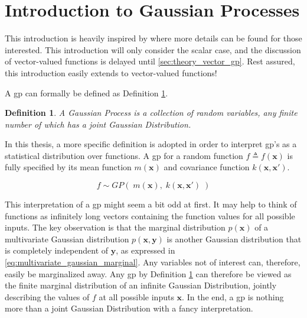 \section{Introduction to Gaussian Processes}\label{sec:gp}

This introduction is heavily inspired by \cite{rasmussen} where more details can be found for those interested. This introduction will only consider the scalar case, and the discussion of vector-valued functions is delayed until \cref{sec:theory_vector_gp}. Rest assured, this introduction easily extends to vector-valued functions!

A \acrfull{gp} can formally be defined as Definition \ref{def:gp}.

\newtheorem{gp_def}{Definition}
\begin{gp_def}\label{def:gp}
A Gaussian Process is a collection of random variables, any finite number of which has a joint Gaussian Distribution.
\end{gp_def}

In this thesis, a more specific definition is adopted in order to interpret \acrshort{gp}'s as a statistical distribution over functions. A \acrshort{gp} for a random function $f \triangleq f(\boldsymbol{x})$ is fully specified by its mean function $m(\boldsymbol{x})$ and covariance function $k(\boldsymbol{x}, \boldsymbol{x}')$.

\begin{equation}\label{eq:gp}
    f \sim GP(\;m(\boldsymbol{x}), \; k(\boldsymbol{x}, \boldsymbol{x}')\;)
\end{equation}

This interpretation of a \acrshort{gp} might seem a bit odd at first. It may help to think of functions as infinitely long vectors containing the function values for all possible inputs. The key observation is that the marginal distribution $p(\boldsymbol{x})$ of a multivariate Gaussian distribution $p(\boldsymbol{x}, \boldsymbol{y})$ is another Gaussian distribution that is completely independent of $\boldsymbol{y}$, as expressed in \cref{eq:multivariate_gaussian_marginal}. Any variables not of interest can, therefore, easily be marginalized away. Any \acrshort{gp} by Definition \ref{def:gp} can therefore be viewed as the finite marginal distribution of an infinite Gaussian Distribution, jointly describing the values of $f$ at all possible inputs $\boldsymbol{x}$. In the end, a \acrshort{gp} is nothing more than a joint Gaussian Distribution with a fancy interpretation.


